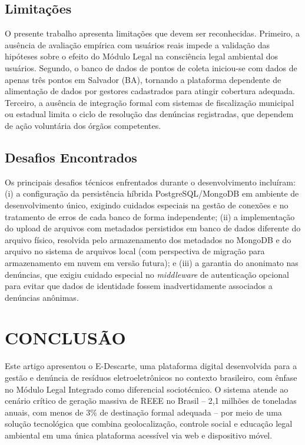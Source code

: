 \documentclass[12pt, a4paper]{article}
\numberwithin{equation}{section}
\numberwithin{figure}{section}
\numberwithin{table}{section}
\begin{document}
\subsection{Limitações}

O presente trabalho apresenta limitações que devem ser reconhecidas. Primeiro,
a ausência de avaliação empírica com usuários reais impede a validação das
hipóteses sobre o efeito do Módulo Legal na consciência legal ambiental dos
usuários. Segundo, o banco de dados de pontos de coleta iniciou-se com dados
de apenas três pontos em Salvador (BA), tornando a plataforma dependente de
alimentação de dados por gestores cadastrados para atingir cobertura adequada.
Terceiro, a ausência de integração formal com sistemas de fiscalização municipal
ou estadual limita o ciclo de resolução das denúncias registradas, que dependem
de ação voluntária dos órgãos competentes.

\subsection{Desafios Encontrados}

Os principais desafios técnicos enfrentados durante o desenvolvimento incluíram:
(i) a configuração da persistência híbrida PostgreSQL/MongoDB em ambiente de
desenvolvimento único, exigindo cuidados especiais na gestão de conexões e no
tratamento de erros de cada banco de forma independente; (ii) a implementação
do upload de arquivos com metadados persistidos em banco de dados diferente do
arquivo físico, resolvida pelo armazenamento dos metadados no MongoDB e do
arquivo no sistema de arquivos local (com perspectiva de migração para
armazenamento em nuvem em versão futura); e (iii) a garantia do anonimato nas
denúncias, que exigiu cuidado especial no \textit{middleware} de autenticação
opcional para evitar que dados de identidade fossem inadvertidamente associados
a denúncias anônimas.

\section{CONCLUSÃO}

Este artigo apresentou o E-Descarte, uma plataforma digital desenvolvida para
a gestão e denúncia de resíduos eletroeletrônicos no contexto brasileiro,
com ênfase no Módulo Legal Integrado como diferencial sociotécnico. O sistema
atende ao cenário crítico de geração massiva de REEE no Brasil -- 2,1 milhões
de toneladas anuais, com menos de 3\% de destinação formal adequada -- por meio
de uma solução tecnológica que combina geolocalização, controle social e
educação legal ambiental em uma única plataforma acessível via web e dispositivo
móvel.
\end{document}
